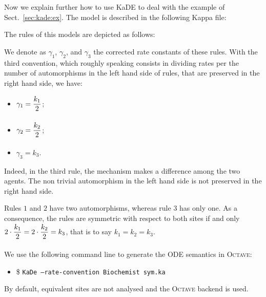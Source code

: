 \documentclass[11pt]{book}
\def\KaDE{\textsf{KaDE}}
\def\ttt#1{\texttt{#1}}
\def\ITE#1{\begin{itemize}#1\end{itemize}}
\begin{document}
Now we explain further how to use {\KaDE} to deal with the example of Sect.~\ref{sec:kade:ex}.
The model is described in the following Kappa file:


The rules of this models are depicted as follows:

\begin{center}
\begin{minipage}{0.49\linewidth}
    \centering{}
  \end{minipage}


\begin{minipage}{0.49\linewidth}
  \centering{}
\end{minipage}


\begin{minipage}{0.49\linewidth}
    \centering{}
  \end{minipage}

\end{center}

We denote as $\gamma_1$, $\gamma_2$, and $\gamma_3$ the corrected rate constants of these rules. With the third convention, which roughly speaking consists in dividing rates per the number of automorphisms in the left hand side of rules, that are preserved in the right hand side, we have:
\begin{itemize}
  \item $\gamma_1 = \frac{\strut \displaystyle k_1}{\strut \displaystyle 2}$;
  \item $\gamma_2 = \frac{\strut \displaystyle k_2}{\strut \displaystyle 2}$;
  \item $\gamma_3 = k_3$.
\end{itemize}
Indeed, in the third rule, the mechanism makes a difference among the two agents. The non trivial automorphism in the left hand side is not preserved in the right hand side.


Rules $1$ and $2$ have two automorphisms, whereas rule $3$ has only one.
As a consequence, the rules are symmetric with respect to both sites if and only $2\cdot\frac{\strut \displaystyle k_1}{\strut \displaystyle 2}=2\cdot\frac{\strut \displaystyle k_2}{\strut \displaystyle 2}=k_3$, that is to say $k_1=k_2=k_3$.


We use the following command line to generate the ODE semantics in \textsc{Octave}:
\ITE{
\item[\$] \ttt{KaDe --rate-convention Biochemist sym.ka}}

By default, equivalent sites are not analysed and the \textsc{Octave} backend is used.
\end{document}
